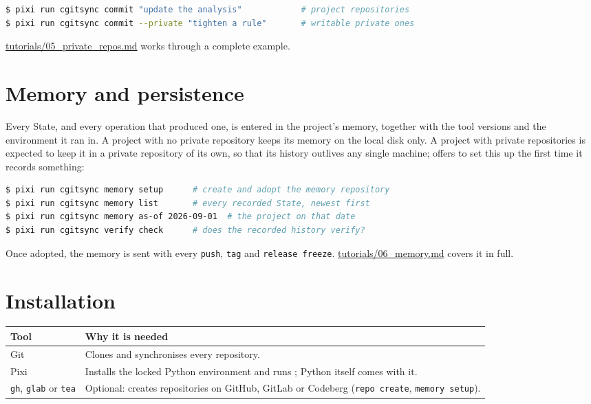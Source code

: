 \begin{lstlisting}[language=bash]
$ pixi run cgitsync commit "update the analysis"            # project repositories
$ pixi run cgitsync commit --private "tighten a rule"       # writable private ones
\end{lstlisting}

\url{tutorials/05_private_repos.md} works through a complete example.

\section{Memory and persistence}

Every State, and every operation that produced one, is entered in the
project's memory, together with the tool versions and the environment it ran
in. A project with no private repository keeps its memory on the local disk
only. A project with private repositories is expected to keep it in a private
repository of its own, so that its history outlives any single machine;
\cgscli{} offers to set this up the first time it records something:

\begin{lstlisting}[language=bash]
$ pixi run cgitsync memory setup      # create and adopt the memory repository
$ pixi run cgitsync memory list       # every recorded State, newest first
$ pixi run cgitsync memory as-of 2026-09-01  # the project on that date
$ pixi run cgitsync verify check      # does the recorded history verify?
\end{lstlisting}

Once adopted, the memory is sent with every \texttt{push}, \texttt{tag} and
\texttt{release freeze}. \url{tutorials/06_memory.md} covers it in full.

\section{Installation}

\begin{center}
\begin{tabular}{lp{9.5cm}}
\textbf{Tool} & \textbf{Why it is needed} \\
\hline
Git & Clones and synchronises every repository. \\
Pixi & Installs the locked Python environment and runs \cgscli{}; Python
  itself comes with it. \\
\texttt{gh}, \texttt{glab} or \texttt{tea} & Optional: creates repositories
  on GitHub, GitLab or Codeberg (\texttt{repo create}, \texttt{memory setup}). \\
\end{tabular}
\end{center}

